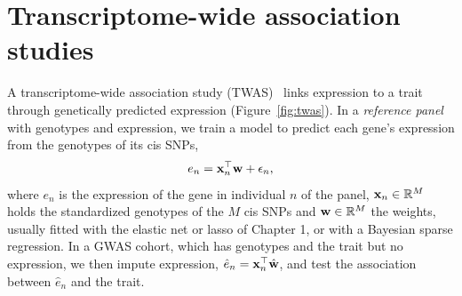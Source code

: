 \section{Transcriptome-wide association studies}

A transcriptome-wide association study (TWAS)~\citep{gamazon2015,gusev2016} links expression to a trait through genetically predicted expression (Figure~\ref{fig:twas}). In a \emph{reference panel} with genotypes and expression, we train a model to predict each gene's expression from the genotypes of its cis SNPs,
\begin{equation}
  e_n = \mathbf{x}_n^\top\mathbf{w} + \epsilon_n,
\end{equation}
where $e_n$ is the expression of the gene in individual $n$ of the panel, $\mathbf{x}_n\in\mathbb{R}^M$ holds the standardized genotypes of the $M$ cis SNPs and $\mathbf{w}\in\mathbb{R}^M$ the weights, usually fitted with the elastic net or lasso of Chapter 1, or with a Bayesian sparse regression. In a GWAS cohort, which has genotypes and the trait but no expression, we then impute expression, $\hat e_n=\mathbf{x}_n^\top\hat{\mathbf{w}}$, and test the association between $\hat e_n$ and the trait.

